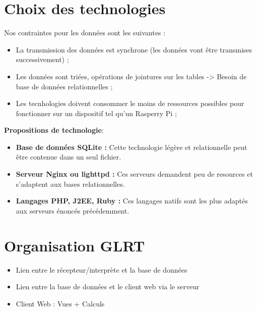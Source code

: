 \documentclass[10pt,a4paper]{article}
\begin{document}
\section{Choix des technologies}
Nos contraintes pour les données sont les suivantes :
\begin{itemize}
\item La transmission des données est synchrone (les données vont être transmises successivement) ;
\item Les données sont triées, opérations de jointures sur les tables -> Besoin de base de données relationnelles ;
\item Les tecnhologies doivent consommer le moins de ressources possibles pour fonctionner sur un dispositif tel qu'un Rasperry Pi ;
\end{itemize}   
\textbf{Propositions de technologie}:
\begin{itemize}
\item \textbf{Base de données SQLite : }Cette technologie légère et relationnelle peut être contenue dans un seul fichier. 
\item \textbf{Serveur Nginx ou lighttpd : }Ces serveurs demandent peu de resources et s'adaptent aux bases relationnelles.
\item \textbf{Langages PHP, J2EE, Ruby : }Ces langages natifs sont les plus adaptés aux serveurs énoncés précédemment.
\end{itemize}
\section{Organisation GLRT}
\begin{itemize}
\item Lien entre le récepteur/interprète et la base de données
\item Lien entre la base de données et le client web via le serveur
\item Client Web : Vues + Calculs
\end{itemize}
\end{document}
